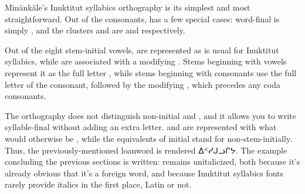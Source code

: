 \noindent Min\"ank\"ale's Inuktitut syllabics orthography is its simplest and
most straightforward. Out of the consonants,  has a few
special cases: word-final  is simply , and the clusters
 and  are  and  respectively.

Out of the eight stem-initial
vowels, \mbox{} are represented as is usual for Inuktitut syllabics,
while \mbox{} are associated with a modifying . Stems beginning with vowels represent it as the full letter
, while stems beginning with consonants use the full letter of
the consonant, followed by the modifying , which precedes any
coda consonants.

The orthography does not distinguish non-initial  and , and it
allows you to write syllable-final  without adding an extra letter.
 and  are represented with what would otherwise be \mbox{}, while the equivalents of initial \mbox{} stand for \mbox{} non-stem-initially. Thus, the previously-mentioned loanword
 is rendered {\inufont ᐃᑉᓯᒍᓗᒋᔭ}. The example concluding the
previous sections is written:
\enlargethispage{2.5cm}  remains unitalicized, both because it's
already obvious that it's a foreign word, and because Inuktitut syllabics fonts
rarely provide italics in the first place, Latin or not.
\pagebreak
